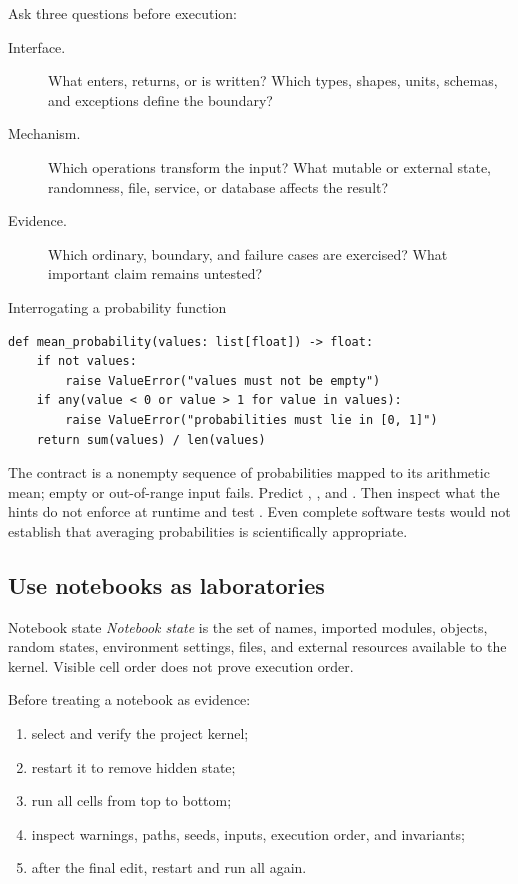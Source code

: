 Ask three questions before execution:

\begin{description}
  \item[Interface.] What enters, returns, or is written? Which types, shapes,
  units, schemas, and exceptions define the boundary?
  \item[Mechanism.] Which operations transform the input? What mutable or
  external state, randomness, file, service, or database affects the result?
  \item[Evidence.] Which ordinary, boundary, and failure cases are exercised?
  What important claim remains untested?
\end{description}

\begin{workedexample}{Interrogating a probability function}
\begin{lstlisting}
def mean_probability(values: list[float]) -> float:
    if not values:
        raise ValueError("values must not be empty")
    if any(value < 0 or value > 1 for value in values):
        raise ValueError("probabilities must lie in [0, 1]")
    return sum(values) / len(values)
\end{lstlisting}

The contract is a nonempty sequence of probabilities mapped to its arithmetic
mean; empty or out-of-range input fails. Predict \code{[0.2, 0.4, 0.6]},
\code{[]}, and \code{[0.4, 1.2]}. Then inspect what the hints do not enforce at
runtime and test . Even complete software tests would not establish
that averaging probabilities is scientifically appropriate.
\end{workedexample}

\subsection{Use notebooks as laboratories}

\begin{definitionbox}{Notebook state}
\emph{Notebook state} is the set of names, imported modules, objects, random
states, environment settings, files, and external resources available to the
kernel. Visible cell order does not prove execution order.
\end{definitionbox}

Before treating a notebook as evidence:

\begin{enumerate}
  \item select and verify the project kernel;
  \item restart it to remove hidden state;
  \item run all cells from top to bottom;
  \item inspect warnings, paths, seeds, inputs, execution order, and invariants;
  \item after the final edit, restart and run all again.
\end{enumerate}

